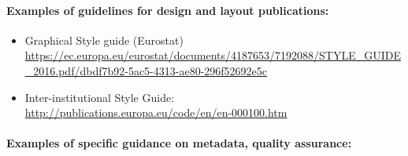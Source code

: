 \documentclass[
]{article}
\begin{document}
\hypertarget{examples-of-guidelines-for-design-and-layout-publications-1}{%
\paragraph{Examples of guidelines for design and layout publications:}\label{examples-of-guidelines-for-design-and-layout-publications-1}}

\begin{itemize}
\item
  Graphical Style guide (Eurostat)\\
  \url{https://ec.europa.eu/eurostat/documents/4187653/7192088/STYLE_GUIDE_2016.pdf/dbdf7b92-5ac5-4313-ae80-296f52692e5c}
\item
  Inter-institutional Style Guide:\\
  \url{http://publications.europa.eu/code/en/en-000100.htm}
\end{itemize}

\hypertarget{examples-of-specific-guidance-on-metadata-quality-assurance-1}{%
\paragraph{Examples of specific guidance on metadata, quality assurance:}\label{examples-of-specific-guidance-on-metadata-quality-assurance-1}}
\end{document}
